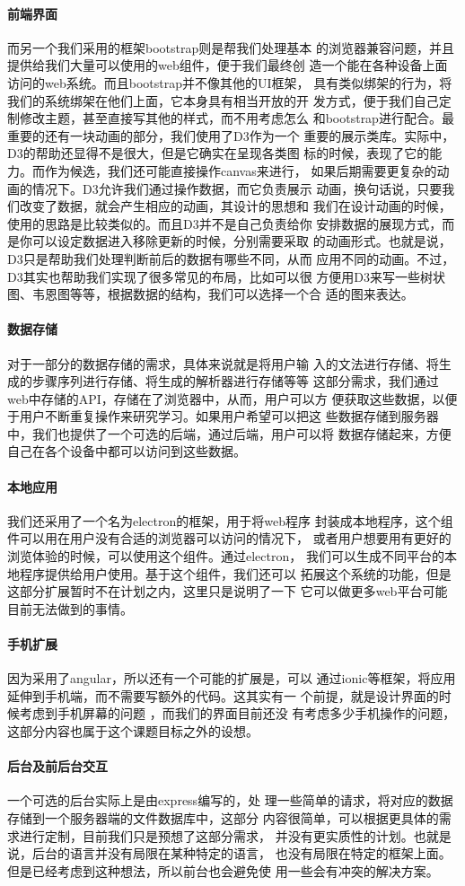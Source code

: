 \paragraph{前端界面} 而另一个我们采用的框架bootstrap则是帮我们处理基本
的浏览器兼容问题，并且提供给我们大量可以使用的web组件，便于我们最终创
造一个能在各种设备上面访问的web系统。而且bootstrap并不像其他的UI框架，
具有类似绑架的行为，将我们的系统绑架在他们上面，它本身具有相当开放的开
发方式，便于我们自己定制修改主题，甚至直接写其他的样式，而不用考虑怎么
和bootstrap进行配合。最重要的还有一块动画的部分，我们使用了D3作为一个
重要的展示类库。实际中，D3的帮助还显得不是很大，但是它确实在呈现各类图
标的时候，表现了它的能力。而作为候选，我们还可能直接操作canvas来进行，
如果后期需要更复杂的动画的情况下。D3允许我们通过操作数据，而它负责展示
动画，换句话说，只要我们改变了数据，就会产生相应的动画，其设计的思想和
我们在设计动画的时候，使用的思路是比较类似的。而且D3并不是自己负责给你
安排数据的展现方式，而是你可以设定数据进入移除更新的时候，分别需要采取
的动画形式。也就是说，D3只是帮助我们处理判断前后的数据有哪些不同，从而
应用不同的动画。不过，D3其实也帮助我们实现了很多常见的布局，比如可以很
方便用D3来写一些树状图、韦恩图等等，根据数据的结构，我们可以选择一个合
适的图来表达。
\paragraph{数据存储} 对于一部分的数据存储的需求，具体来说就是将用户输
入的文法进行存储、将生成的步骤序列进行存储、将生成的解析器进行存储等等
这部分需求，我们通过web中存储的API，存储在了浏览器中，从而，用户可以方
便获取这些数据，以便于用户不断重复操作来研究学习。如果用户希望可以把这
些数据存储到服务器中，我们也提供了一个可选的后端，通过后端，用户可以将
数据存储起来，方便自己在各个设备中都可以访问到这些数据。
\paragraph{本地应用}我们还采用了一个名为electron的框架，用于将web程序
封装成本地程序，这个组件可以用在用户没有合适的浏览器可以访问的情况下，
或者用户想要用有更好的浏览体验的时候，可以使用这个组件。通过electron，
我们可以生成不同平台的本地程序提供给用户使用。基于这个组件，我们还可以
拓展这个系统的功能，但是这部分扩展暂时不在计划之内，这里只是说明了一下
它可以做更多web平台可能目前无法做到的事情。
\paragraph{手机扩展}因为采用了angular，所以还有一个可能的扩展是，可以
通过ionic等框架，将应用延伸到手机端，而不需要写额外的代码。这其实有一
个前提，就是设计界面的时候考虑到手机屏幕的问题 ，而我们的界面目前还没
有考虑多少手机操作的问题，这部分内容也属于这个课题目标之外的设想。
\paragraph{后台及前后台交互} 一个可选的后台实际上是由express编写的，处
理一些简单的请求，将对应的数据存储到一个服务器端的文件数据库中，这部分
内容很简单，可以根据更具体的需求进行定制，目前我们只是预想了这部分需求，
并没有更实质性的计划。也就是说，后台的语言并没有局限在某种特定的语言，
也没有局限在特定的框架上面。但是已经考虑到这种想法，所以前台也会避免使
用一些会有冲突的解决方案。